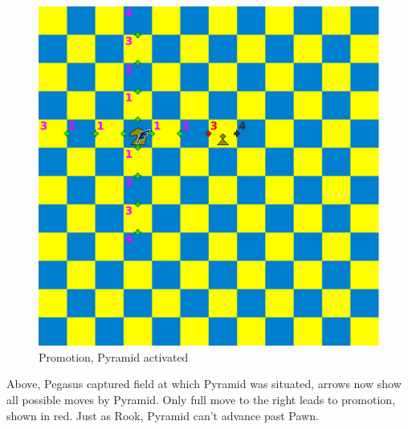\documentclass[a5paper,12pt,draft]{book} %
\begin{document}
\noindent
\begin{figure}[!h]
\includegraphics[width=1.0\textwidth, keepaspectratio=true]{../gfx/examples/05_move_pyramid_promo_activate.png}
\caption{Promotion, Pyramid activated}
\label{fig:ma_promo_activate}
\end{figure}

Above, Pegasus captured field at which Pyramid was situated, arrows now show
all possible moves by Pyramid. Only full move to the right leads to promotion,
shown in red. Just as Rook, Pyramid can't advance past Pawn.

\clearpage
\end{document}
